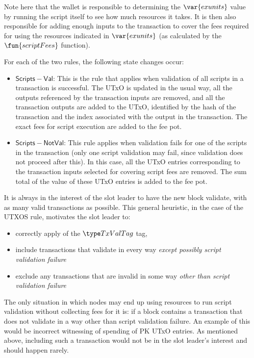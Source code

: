 Note here that the wallet is responsible to determining the $\var{exunits}$ value
by running the script itself to see how much resources it takes. It is then
also responsible for adding enough inputs to the transaction to cover the
fees required for using the resources indicated in $\var{exunits}$ (as
calculated by the $\fun{scriptFees}$ function).

For each of the two rules, the following state changes occur:

\begin{itemize}
  \item $\mathsf{Scripts-Val}$: This is the rule that applies when validation
  of all scripts in a transaction is successful. The UTxO is updated in the usual way, all
  the outputs referenced by the transaction inputs are removed, and all the
  transaction outputs are added to the UTxO, identified by the hash of
  the transaction and the index associated with the output in the transaction.
  The exact fees for script execution are added to the fee pot.

  \item $\mathsf{Scripts-NotVal}$: This rule applies when validation fails
  for one of the scripts in the transaction (only one script validation may fail,
  since validation does not proceed after this). In this case, all the
  UTxO entries corresponding to the transaction inputs selected for covering
  script fees are removed. The sum total of the value of these UTxO entries
  is added to the fee pot.
\end{itemize}

It is always in the interest of the slot leader to have the new block validate,
with as many valid transactions as possible. This general heuristic,
in the case of the UTXOS rule, motivates the
slot leader to:

\begin{itemize}
  \item correctly apply of the $\TxValTag$ tag,
  \item include transactions that validate in every way
  \textit{except possibly script validation failure}
  \item exclude any transactions that are invalid
in some way \textit{other than script validation failure}
\end{itemize}

The only situation in which nodes may end up using resources to run
script validation without collecting fees for it is: if a block contains
a transaction that does not validate in a way other than script validation
failure. An example of this would be incorrect witnessing of spending
of PK UTxO entries. As mentioned above, including such a transaction would not be
in the slot leader's interest and should happen rarely.

